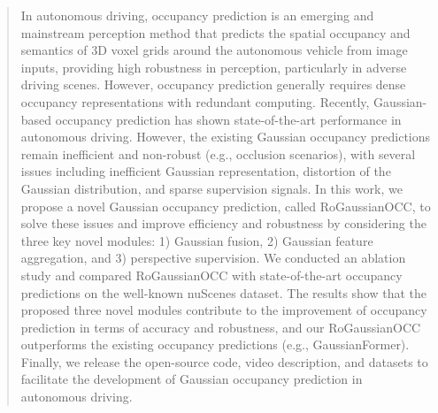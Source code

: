 \documentclass[journal]{IEEEtran}
\begin{document}
\begin{abstract}
In autonomous driving, occupancy prediction is an emerging and mainstream perception method that predicts the spatial occupancy and semantics of 3D voxel grids around the autonomous vehicle from image inputs, providing high robustness in perception, particularly in adverse driving scenes.
However, occupancy prediction generally requires dense occupancy representations with redundant computing.
Recently, Gaussian-based occupancy prediction has shown state-of-the-art performance in autonomous driving. 
However, the existing Gaussian occupancy predictions remain inefficient and non-robust (e.g., occlusion scenarios), with several issues including inefficient Gaussian representation, distortion of the Gaussian distribution, and sparse supervision signals.
In this work, we propose a novel Gaussian occupancy prediction, called RoGaussianOCC, to solve these issues and improve efficiency and robustness by considering the three key novel modules: 1) Gaussian fusion, 2) Gaussian feature aggregation, and 3) perspective supervision.
We conducted an ablation study and compared RoGaussianOCC with state-of-the-art occupancy predictions on the well-known nuScenes dataset.
The results show that the proposed three novel modules contribute to the improvement of occupancy prediction in terms of accuracy and robustness, and our RoGaussianOCC outperforms the existing occupancy predictions (e.g., GaussianFormer).
Finally, we release the open-source code, video description, and datasets to facilitate the development of Gaussian occupancy prediction in autonomous driving.
\end{abstract}


\end{document}
